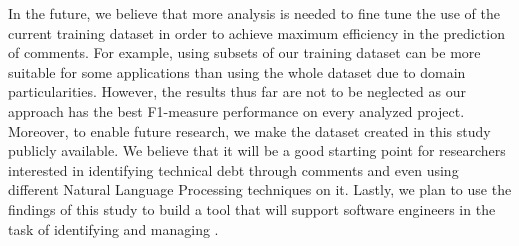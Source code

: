In the future, we believe that more analysis is needed to fine tune the use of the current training dataset in order to achieve maximum efficiency in the prediction of \SATD comments. For example, using subsets of our training dataset can be more suitable for some applications than using the whole dataset due to domain particularities. However, the results thus far are not to be neglected as our approach has the best F1-measure performance on every analyzed project. Moreover, to enable future research, we make the dataset created in this study publicly available. We believe that it will be a good starting point for researchers interested in identifying technical debt through comments and even using different Natural Language Processing techniques on it. Lastly, we plan to use the findings of this study to build a tool that will support software engineers in the task of identifying and managing \SATD. 



